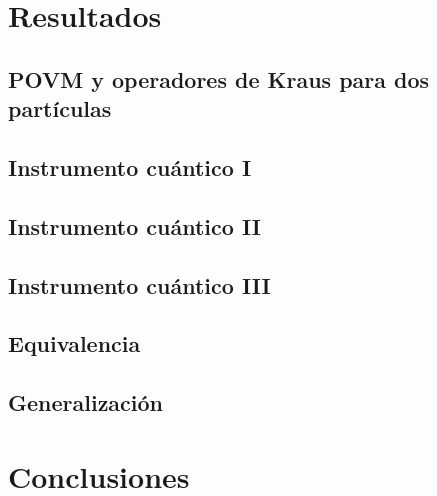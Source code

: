 \documentclass[12pt,letterpaper]{book}\raggedbottom{}
\begin{document}
\section{Resultados}

\subsection{POVM y operadores de Kraus para dos partículas}

\subsection{Instrumento cuántico I}

\subsection{Instrumento cuántico II}

\subsection{Instrumento cuántico III}


\subsection{Equivalencia}

\subsection{Generalización}

\section{Conclusiones}
\end{document}
